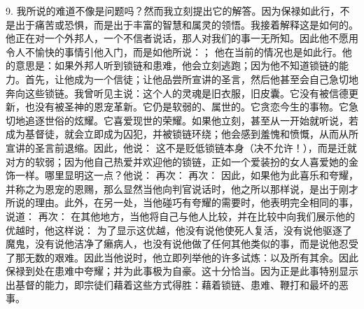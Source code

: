 9. 我所说的难道不像是问题吗？然而我立刻提出它的解答。因为保禄如此行，不是出于痛苦或恐惧，而是出于丰富的智慧和属灵的领悟。我接着解释这是如何的。他正在对一个外邦人，一个不信者说话，那人对我们的事一无所知。因此他不愿用令人不愉快的事情引他入门，而是如他所说：；\newline{} 他在当前的情况也是如此行。他的意思是：如果外邦人听到锁链和患难，他会立刻逃跑；因为他不知道锁链的能力。首先，让他成为一个信徒；让他品尝所宣讲的圣言，然后他甚至会自己急切地奔向这些锁链。我曾听见主说：这个人的灵魂是旧衣服，旧皮囊。它没有被信德更新，也没有被圣神的恩宠革新。它仍是软弱的、属世的。它贪恋今生的事物。它急切地追逐世俗的炫耀。它喜爱现世的荣耀。如果他立刻，甚至从一开始就听说，若成为基督徒，就会立即成为囚犯，并被锁链环绕；他会感到羞愧和愤慨，从而从所宣讲的圣言前退缩。因此，他说：\newline{} 这不是贬低锁链本身（决不允许！），而是迁就对方的软弱；因为他自己热爱并欢迎他的锁链，正如一个爱装扮的女人喜爱她的金饰一样。哪里显明这一点？他说：\newline{} 再次：\newline{} 再次：\newline{} 因此，如果他为此喜乐和夸耀，并称之为恩宠的恩赐，那么显然当他向判官说话时，他之所以那样说，是出于刚才所说的理由。此外，在另一处，当他碰巧有夸耀的需要时，他表明完全相同的事，说道：\newline{} 再次：\newline{} 在其他地方，当他将自己与他人比较，并在比较中向我们展示他的优越时，他这样说：\newline{} 为了显示这优越，他没有说他使死人复活，没有说他驱逐了魔鬼，没有说他洁净了癞病人，也没有说他做了任何其他类似的事，而是说他忍受了那无数的艰难。因此当他说时，他立即列举他的许多试炼：以及所有其余。因此保禄到处在患难中夸耀；并为此事极为自豪。这十分恰当。因为正是此事特别显示出基督的能力，即宗徒们藉着这些方式得胜：藉着锁链、患难、鞭打和最坏的恶事。\par

